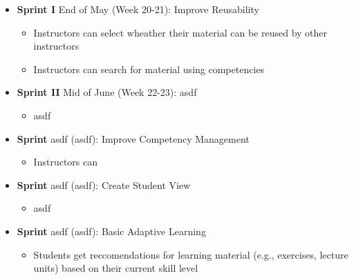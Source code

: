 \documentclass[a4paper,12pt,twoside]{article}
\begin{document}
\begin{itemize}
        \item \textbf{Sprint I} End of May (Week 20-21): Improve Reusability
              \begin{itemize}
                      \item Instructors can select wheather their material can be reused by other instructors
                      \item Instructors can search for material using competencies
              \end{itemize}

        \item \textbf{Sprint II} Mid of June (Week 22-23): asdf
              \begin{itemize}
                      \item asdf
              \end{itemize}

        \item \textbf{Sprint } asdf (asdf): Improve Competency Management
              \begin{itemize}
                      \item Instructors can
              \end{itemize}

        \item \textbf{Sprint } asdf (asdf): Create Student View
              \begin{itemize}
                      \item asdf
              \end{itemize}

        \item \textbf{Sprint } asdf (asdf): Basic Adaptive Learning
              \begin{itemize}
                      \item Students get reccomendations for learning material (e.g., exercises, lecture units) based on their current skill level
              \end{itemize}
\end{itemize}

\clearpage

\clearpage


\end{document}
